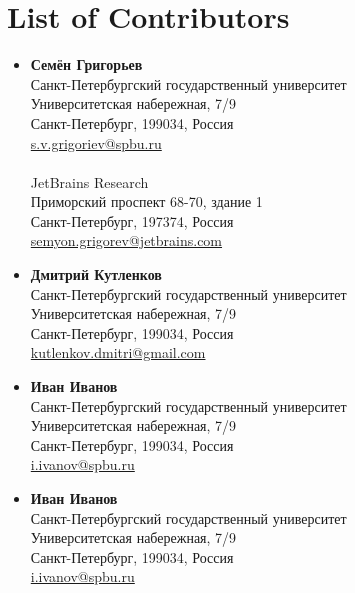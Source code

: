 \section{List of Contributors}
\begin{multicols}{2}
    \begin{itemize}
        \item \textbf{Семён Григорьев} \\
              Санкт-Петербургский государственный университет \\
              Университетская набережная, 7/9 \\
              Санкт-Петербург, 199034, Россия \\
              \url{s.v.grigoriev@spbu.ru}\\
              \\
              JetBrains Research \\
              Приморский проспект 68-70, здание 1 \\
              Санкт-Петербург, 197374, Россия \\
              \url{semyon.grigorev@jetbrains.com}
             

        \item \textbf{Дмитрий Кутленков} \\
              Санкт-Петербургский государственный университет \\
              Университетская набережная, 7/9 \\
              Санкт-Петербург, 199034, Россия \\
              \url{kutlenkov.dmitri@gmail.com}

        \item \textbf{Иван Иванов} \\
              Санкт-Петербургский государственный университет \\
              Университетская набережная, 7/9 \\
              Санкт-Петербург, 199034, Россия \\
              \url{i.ivanov@spbu.ru}

        \item \textbf{Иван Иванов} \\
              Санкт-Петербургский государственный университет \\
              Университетская набережная, 7/9 \\
              Санкт-Петербург, 199034, Россия \\
              \url{i.ivanov@spbu.ru}


\end{itemize}
\end{multicols}
